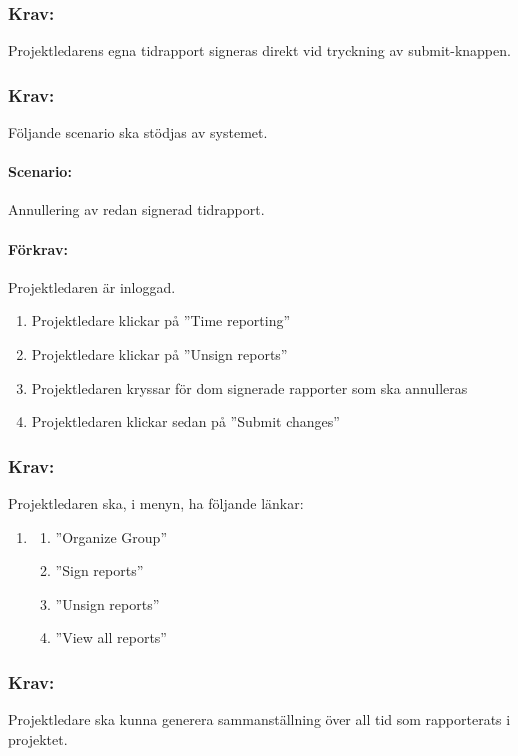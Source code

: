 \documentclass[paper=a4, fontsize=11pt,twoside]{article}
\begin{document}
\subsubsection{Krav:}
Projektledarens egna tidrapport signeras direkt vid tryckning av submit-knappen.

\subsubsection{Krav:}
Följande scenario ska stödjas av systemet.
\paragraph{Scenario:} Annullering av redan signerad tidrapport.
\paragraph{Förkrav:} Projektledaren är inloggad.
\begin{enumerate}
\item Projektledare klickar på ”Time reporting”
\item Projektledare klickar på ”Unsign reports”
\item Projektledaren kryssar för dom signerade rapporter som ska annulleras
\item Projektledaren klickar sedan på ”Submit changes”
\end{enumerate}

\subsubsection{Krav:}
Projektledaren ska, i menyn, ha följande länkar:
\begin{enumerate}
\item[]
\begin{enumerate}
\item ”Organize Group”
\item ”Sign reports”
\item ”Unsign reports”
\item ”View all reports”
\end{enumerate}
\end{enumerate}

\subsubsection{Krav:}
Projektledare ska kunna generera sammanställning över all tid som rapporterats i projektet.
\end{document}
